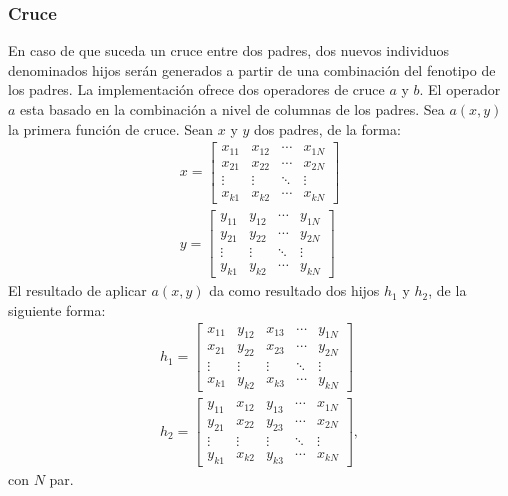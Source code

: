 \documentclass[conference]{IEEEtran}
\begin{document}
 \subsubsection{Cruce}
   	En caso de que suceda un cruce entre dos padres, dos nuevos individuos denominados hijos serán generados a partir de una combinación del fenotipo de los padres. La implementación ofrece dos operadores de cruce $a$ y $b$. El operador $a$ esta basado en la combinación a nivel de columnas de los padres. 
    Sea $a(x,y)$ la primera función de cruce. Sean $x$ y $y$ dos padres, de la forma:
    \begin{eqnarray}
    x= \begin{bmatrix}
x_{11} & x_{12} &\cdots   & x_{1N}\\ 
x_{21} & x_{22} &\cdots   & x_{2N}\\ 
 \vdots & \vdots  & \ddots  & \vdots \\ 
 x_{k1} & x_{k2} &\cdots   & x_{kN}
\end{bmatrix}\\
	y = \begin{bmatrix}
y_{11} & y_{12} &\cdots   & y_{1N}\\ 
y_{21} & y_{22} &\cdots   & y_{2N}\\ 
 \vdots & \vdots  & \ddots  & \vdots \\ 
 y_{k1} & y_{k2} &\cdots   & y_{kN}
\end{bmatrix}
    \end{eqnarray}
  El resultado de aplicar $a(x,y)$ da como resultado dos hijos $h_1$ y $h_2$, de la siguiente forma:
  \begin{eqnarray}
  h_1 = \begin{bmatrix}
x_{11} & y_{12} &x_{13}& \cdots  & y_{1N}\\ 
x_{21} & y_{22} &x_{23}& \cdots  & y_{2N}\\ 
 \vdots & \vdots  & \vdots  & \ddots &\vdots\\ 
x_{k1} & y_{k2} &x_{k3}& \cdots  & y_{kN}
\end{bmatrix}
\\
h_2 = \begin{bmatrix}
y_{11} & x_{12} &y_{13}& \cdots  & x_{1N}\\ 
y_{21} & x_{22} &y_{23}& \cdots  & x_{2N}\\ 
 \vdots & \vdots  & \vdots  & \ddots &\vdots\\ 
y_{k1} & x_{k2} &y_{k3}& \cdots  & x_{kN}
\end{bmatrix},
  \end{eqnarray} con $N$ par. 
\end{document}
